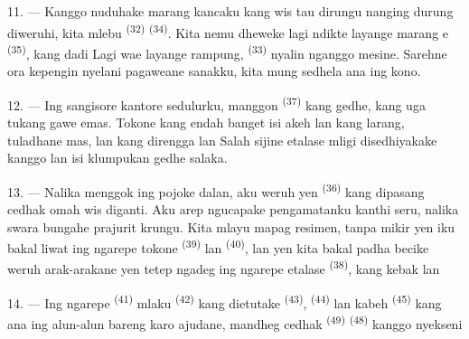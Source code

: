 \VUsaut{3.0mm}

11. --- Kanggo nuduhake marang kancaku  kang wis tau
dirungu nanging durung diweruhi, kita mlebu 
\textsuperscript{(32)}  \textsuperscript{(34)}.
Kita nemu dheweke lagi ndikte layange marang e
\textsuperscript{(35)}, kang dadi  Lagi wae
layange rampung,  \textsuperscript{(33)} nyalin nganggo
mesine. Sarehne ora kepengin nyelani pagaweane sanakku, kita mung
sedhela ana ing kono.

12. --- Ing sangisore kantore sedulurku, manggon  \textsuperscript{(37)} kang gedhe, kang uga tukang gawe emas.
Tokone kang endah banget isi akeh  lan  kang larang, tuladhane
  mas,  lan
 kang direngga  lan 
Salah sijine etalase mligi disedhiyakake kanggo 
lan isi klumpukan gedhe  salaka.

13. --- Nalika menggok ing pojoke dalan, aku weruh yen  \textsuperscript{(36)} kang dipasang cedhak  omah
wis diganti. Aku arep ngucapake pengamatanku kanthi seru, nalika swara
bungahe  prajurit krungu. Kita mlayu mapag resimen, tanpa
mikir yen  iku bakal liwat ing ngarepe tokone
 \textsuperscript{(39)} lan  \textsuperscript{(40)}, lan yen kita bakal padha becike weruh
arak-arakane yen tetep ngadeg ing ngarepe etalase  \textsuperscript{(38)}, kang kebak  lan 

\VUsaut{3.0mm}

14. --- Ing ngarepe  \textsuperscript{(41)} mlaku
 \textsuperscript{(42)} kang dietutake  \textsuperscript{(43)}, 
\textsuperscript{(44)} lan kabeh 
 \textsuperscript{(45)} kang ana ing alun-alun bareng karo
ajudane, mandheg cedhak  \textsuperscript{(49)}
 \textsuperscript{(48)} kanggo nyekseni


